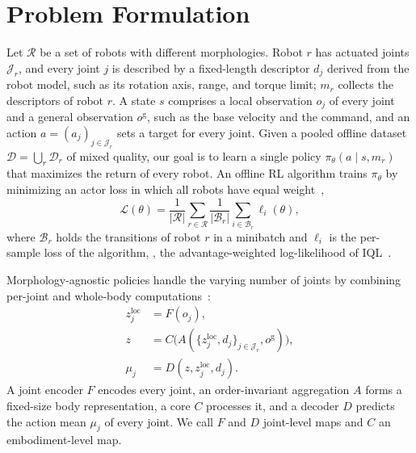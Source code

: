 \section{Problem Formulation}
\label{sec:prelim}

Let $\mathcal{R}$ be a set of robots with different morphologies. Robot $r$ has actuated joints $\mathcal{J}_r$, and
every joint $j$ is described by a fixed-length descriptor $d_j$ derived from the robot model, such as its rotation
axis, range, and torque limit; $m_r$ collects the descriptors of robot $r$. A state $s$ comprises a local observation
$o_j$ of every joint and a general observation $o^{\mathrm{g}}$, such as the base velocity and the command, and an
action $a=(a_j)_{j\in\mathcal{J}_r}$ sets a target for every joint. Given a pooled offline dataset
$\mathcal{D}=\bigcup_{r}\mathcal{D}_r$ of mixed quality, our goal is to learn a single policy
$\pi_\theta(a\mid s,m_r)$ that maximizes the return of every robot. An offline RL algorithm trains $\pi_\theta$ by
minimizing an actor loss in which all robots have equal weight~\citep{abe2026crossembodimentoffline},
\begin{equation}
\mathcal{L}(\theta)=\frac{1}{|\mathcal{R}|}\sum_{r\in\mathcal{R}}\frac{1}{|\mathcal{B}_r|}
\sum_{i\in\mathcal{B}_r}\ell_i(\theta),
\label{eq:actor_loss}
\end{equation}
where $\mathcal{B}_r$ holds the transitions of robot $r$ in a minibatch and $\ell_i$ is the per-sample loss of the
algorithm, \eg, the advantage-weighted log-likelihood of IQL~\citep{kostrikov2022iql}.

Morphology-agnostic policies handle the varying number of joints by combining per-joint and whole-body
computations~\citep{huang2020smp,gupta2022metamorph,bohlinger2024onepolicy}:
\begin{equation}
\begin{aligned}
z^{\mathrm{loc}}_j&=F(o_j),\\
z&=C\bigl(A(\{z^{\mathrm{loc}}_j,d_j\}_{j\in\mathcal{J}_r},o^{\mathrm{g}})\bigr),\\
\mu_j&=D(z,z^{\mathrm{loc}}_j,d_j).
\end{aligned}
\label{eq:policy}
\end{equation}
A joint encoder $F$ encodes every joint, an order-invariant aggregation $A$ forms a fixed-size body representation, a
core $C$ processes it, and a decoder $D$ predicts the action mean $\mu_j$ of every joint. We call $F$ and $D$
joint-level maps and $C$ an embodiment-level map.

